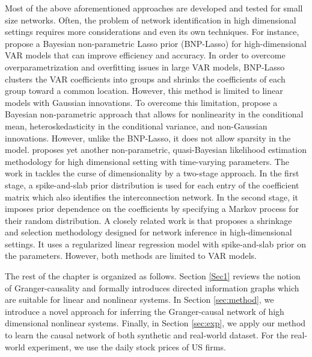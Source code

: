 Most of the above aforementioned approaches are developed and tested for small size networks. 
Often, the problem of network identification in high dimensional settings requires more considerations and even its own techniques. 
For instance, \citet{billio2019bayesian} propose a Bayesian non-parametric Lasso prior (BNP-Lasso) for high-dimensional VAR models that can improve efficiency and accuracy. 
In order to overcome overparametrization and overfitting issues in large VAR models, BNP-Lasso clusters the VAR coefficients into groups and shrinks the coefficients of each group toward a common location.
However, this method is limited to linear models with Gaussian innovations.
To overcome this limitation, \citet{kalli2018bayesian} propose a Bayesian non-parametric approach that allows for nonlinearity in the conditional mean, heteroskedasticity in the conditional variance, and non-Gaussian innovations. However, unlike the BNP-Lasso, it does not allow sparsity in the model.
\citet{petrova2019quasi} proposes yet another non-parametric, quasi-Bayesian likelihood estimation methodology for high dimensional setting with time-varying parameters. 
The work in \citet{iacopini2019bayesian} tackles the curse of dimensionality by a two-stage approach. In the first stage, a spike-and-slab prior distribution is used for each entry of the coefficient matrix which also identifies the interconnection network.
In the second stage, it imposes prior dependence on the coefficients by specifying a Markov process for their random distribution. 
A closely related work is \citet{bernardi2019high} that proposes a shrinkage and selection methodology designed for network inference in high-dimensional settings. It uses a regularized linear regression model with spike-and-slab prior on the parameters.
However, both methods are limited to VAR models.



The rest of the chapter is organized as follows. 
Section \ref{Sec1} reviews the notion of Granger-causality and formally introduces directed information graphs which are suitable for linear and nonlinear systems. 
In Section \ref{sec:method}, we introduce a novel approach for inferring the Granger-causal network of high dimensional nonlinear systems. 
Finally, in Section \ref{sec:exp}, we apply our method to learn the causal network of both synthetic and real-world dataset. For the real-world experiment, we use the daily stock prices of US firms.

